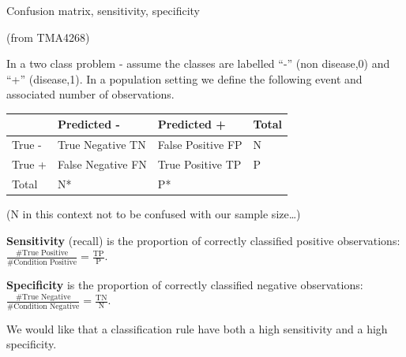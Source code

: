\documentclass[
  ignorenonframetext,
]{beamer}
\begin{document}
\begin{frame}

\begin{block}{Confusion matrix, sensitivity, specificity}

(from TMA4268)

In a two class problem - assume the classes are labelled ``-'' (non
disease,0) and ``+'' (disease,1). In a population setting we define the
following event and associated number of observations.

\begin{longtable}[]{@{}llll@{}}
\toprule
& Predicted - & Predicted + & Total\tabularnewline
\midrule
\endhead
True - & True Negative TN & False Positive FP & N\tabularnewline
True + & False Negative FN & True Positive TP & P\tabularnewline
Total & N* & P* &\tabularnewline
\bottomrule
\end{longtable}

(N in this context not to be confused with our sample size\ldots)

\end{block}

\end{frame}

\begin{frame}

\textbf{Sensitivity} (recall) is the proportion of correctly classified
positive observations:
\(\frac{\# \text{True Positive}}{\# \text{Condition Positive}}=\frac{\text{TP}}{\text{P}}\).

\textbf{Specificity} is the proportion of correctly classified negative
observations:
\(\frac{\# \text{True Negative}}{\# \text{Condition Negative}}=\frac{\text{TN}}{\text{N}}\).

We would like that a classification rule have both a high sensitivity
and a high specificity.

\end{frame}
\end{document}

